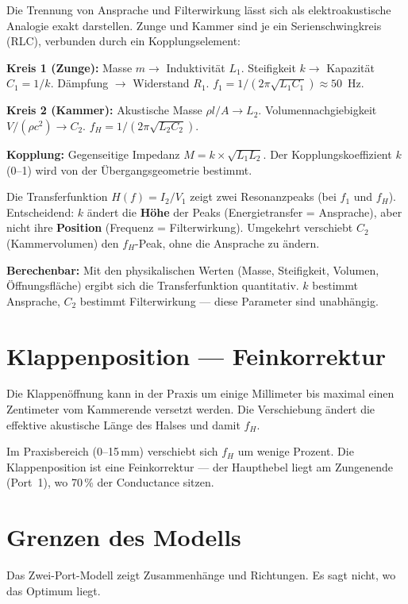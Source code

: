 \documentclass[11pt,a4paper]{article}
\begin{document}
Die Trennung von Ansprache und Filterwirkung lässt sich als
elektroakustische Analogie exakt darstellen. Zunge und Kammer sind je
ein Serienschwingkreis (RLC), verbunden durch ein Kopplungselement:

\textbf{Kreis 1 (Zunge):} Masse $m \to$ Induktivität $L_1$.
Steifigkeit $k \to$ Kapazität $C_1 = 1/k$.
Dämpfung $\to$ Widerstand $R_1$.
$f_1 = 1/(2\pi\sqrt{L_1 C_1}) \approx 50$~Hz.

\textbf{Kreis 2 (Kammer):} Akustische Masse $\rho l/A \to L_2$.
Volumennachgiebigkeit $V/(\rho c^2) \to C_2$.
$f_H = 1/(2\pi\sqrt{L_2 C_2})$.

\textbf{Kopplung:} Gegenseitige Impedanz $M = k \times \sqrt{L_1 L_2}$.
Der Kopplungskoeffizient $k$ (0--1) wird von der Übergangsgeometrie bestimmt.

Die Transferfunktion $H(f) = I_2 / V_1$ zeigt zwei Resonanzpeaks (bei $f_1$ und $f_H$).
Entscheidend: $k$ ändert die \textbf{Höhe} der Peaks (Energietransfer = Ansprache),
aber nicht ihre \textbf{Position} (Frequenz = Filterwirkung). Umgekehrt
verschiebt $C_2$ (Kammervolumen) den $f_H$-Peak, ohne die Ansprache zu ändern.

\begin{tcolorbox}[colframe=keygreen, colback=green!5!white]
\textbf{Berechenbar:} Mit den physikalischen Werten (Masse, Steifigkeit,
Volumen, Öffnungsfläche) ergibt sich die Transferfunktion quantitativ.
$k$ bestimmt Ansprache, $C_2$ bestimmt Filterwirkung ---
diese Parameter sind unabhängig.
\end{tcolorbox}

\section{Klappenposition --- Feinkorrektur}

Die Klappenöffnung kann in der Praxis um einige Millimeter bis maximal
einen Zentimeter vom Kammerende versetzt werden. Die Verschiebung ändert
die effektive akustische Länge des Halses und damit $f_H$.

Im Praxisbereich (0--15\,mm) verschiebt sich $f_H$ um wenige Prozent.
Die Klappenposition ist eine Feinkorrektur --- der Haupthebel liegt am
Zungenende (Port~1), wo 70\,\% der Conductance sitzen.

\section{Grenzen des Modells}

Das Zwei-Port-Modell zeigt Zusammenhänge und Richtungen.
Es sagt nicht, wo das Optimum liegt.
\end{document}
